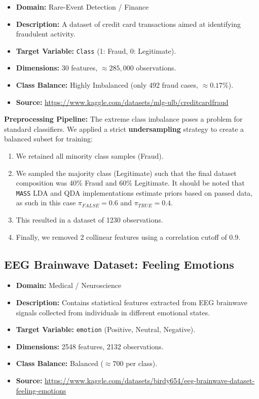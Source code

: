 \documentclass[a4paper,11pt,twoside]{report}
\theoremstyle{definition}
\begin{document}
\begin{itemize}
    \item \textbf{Domain:} Rare-Event Detection / Finance
    \item \textbf{Description:} A dataset of credit card transactions aimed at identifying fraudulent activity.
    \item \textbf{Target Variable:} \texttt{Class} (1: Fraud, 0: Legitimate).
    \item \textbf{Dimensions:} 30 features, $\approx 285,000$ observations.
    \item \textbf{Class Balance:} Highly Imbalanced (only 492 fraud cases, $\approx 0.17\%$).
    \item \textbf{Source:} \url{https://www.kaggle.com/datasets/mlg-ulb/creditcardfraud}~\cite{ulb_creditcard_fraud}
\end{itemize}

\textbf{Preprocessing Pipeline:}
The extreme class imbalance poses a problem for standard classifiers. We applied a strict \textbf{undersampling} strategy to create a balanced subset for training:
\begin{enumerate}
    \item We retained all minority class samples (Fraud).
    \item We sampled the majority class (Legitimate) such that the final dataset composition was 40\% Fraud and 60\% Legitimate. It should be noted that \texttt{MASS} LDA and QDA implementations estimate priors based on passed data, as such in this case $\pi_{FALSE} = 0.6$ and $\pi_{TRUE} = 0.4$.
    \item This resulted in a dataset of 1230 observations.
    \item Finally, we removed 2 collinear features using a correlation cutoff of 0.9.
\end{enumerate}

\subsection{EEG Brainwave Dataset: Feeling Emotions}

\begin{itemize}
    \item \textbf{Domain:} Medical / Neuroscience
    \item \textbf{Description:} Contains statistical features extracted from EEG brainwave signals collected from individuals in different emotional states.
    \item \textbf{Target Variable:} \texttt{emotion} (Positive, Neutral, Negative).
    \item \textbf{Dimensions:} 2548 features, 2132 observations.
    \item \textbf{Class Balance:} Balanced ($\approx 700$ per class).
    \item \textbf{Source:} \url{https://www.kaggle.com/datasets/birdy654/eeg-brainwave-dataset-feeling-emotions}~\cite{birdy654_eeg_emotions}
\end{itemize}
\end{document}
